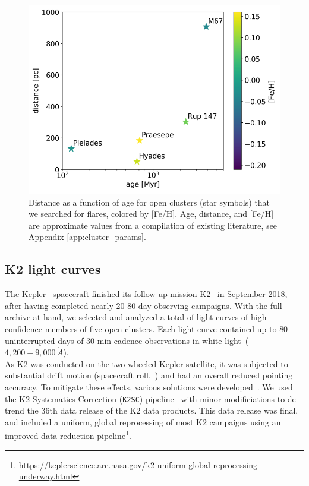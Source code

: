 \documentclass{aa}
\begin{document}
     \begin{figure}[t]
            \includegraphics[width=\hsize]{pics/clusters/openclusters_logage_vs_distance.png}
         \caption{Distance as a function of age for open clusters (star symbols) that we searched for flares, colored by [Fe/H]. Age, distance, and [Fe/H] are approximate values from a compilation of existing literature, see Appendix \ref{app:cluster_params}.}
         \label{fig:OCs}
   \end{figure}

\subsection{K2 light curves}
\label{sec:sec:k2lc}
The Kepler~\citep{koch2010} spacecraft finished its follow-up mission K2~\citep{howell_k2_2014} in September 2018, after having completed nearly 20 80-day observing campaigns. With the full archive at hand, we selected and analyzed a total of light curves of high confidence members of five open clusters. Each light curve contained up to $80$ uninterrupted days of $30$ min cadence observations in white light~($4,200-9,000\,\mathring{A}$).
\\
As K2 was conducted on the two-wheeled Kepler satellite, it was subjected to substantial drift motion (spacecraft roll,~\citealt{van_cleve_thats_2016}) and had an overall reduced pointing accuracy. To mitigate these effects, various solutions were developed~\citep{vanderburg_k2sff_2014, aigrain_k2sc_2016, luger_everest_2016, luger_everst_2018}. We used the K2 Systematics Correction (\texttt{K2SC}) pipeline~\citep{aigrain_k2sc_2016} with minor modificiations to de-trend the 36th data release of the K2 data products. This data release was final, and included a uniform, global reprocessing of most K2 campaigns using an improved data reduction pipeline\footnote{\url{https://keplerscience.arc.nasa.gov/k2-uniform-global-reprocessing-underway.html}}.
\end{document}
